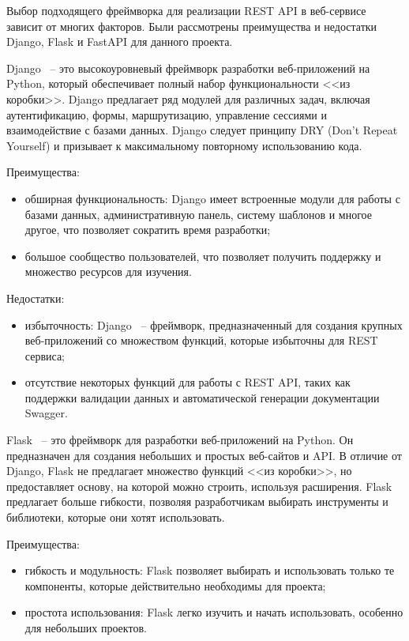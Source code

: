 Выбор подходящего фреймворка для реализации REST API в веб-сервисе зависит от многих факторов. Были рассмотрены преимущества и недостатки Django, Flask и FastAPI для данного проекта.

Django ~-- это высокоуровневый фреймворк разработки веб-приложений на Python, который обеспечивает полный набор функциональности <<из коробки>>. Django предлагает ряд модулей для различных задач, включая аутентификацию, формы, маршрутизацию, управление сессиями и взаимодействие с базами данных. Django следует принципу DRY (Don't Repeat Yourself) и призывает к максимальному повторному использованию кода.

Преимущества:
\begin{itemize}
    \item обширная функциональность: Django имеет встроенные модули для работы с базами данных, административную панель, систему шаблонов и многое другое, что позволяет сократить время разработки;
    \item большое сообщество пользователей, что позволяет получить поддержку и множество ресурсов для изучения.
\end{itemize}

Недостатки:
\begin{itemize}
    \item избыточность: Django ~-- фреймворк, предназначенный для создания крупных веб-приложений со множеством функций, которые избыточны для REST сервиса;
    \item отсутствие некоторых функций для работы с REST API, таких как поддержки валидации данных и автоматической генерации документации Swagger.
\end{itemize}

Flask ~-- это фреймворк для разработки веб-приложений на Python. Он предназначен для создания небольших и простых веб-сайтов и API. В отличие от Django, Flask не предлагает множество функций <<из коробки>>, но предоставляет основу, на которой можно строить, используя расширения. Flask предлагает больше гибкости, позволяя разработчикам выбирать инструменты и библиотеки, которые они хотят использовать.

Преимущества:
\begin{itemize}
    \item гибкость и модульность: Flask позволяет выбирать и использовать только те компоненты, которые действительно необходимы для проекта;
    \item простота использования: Flask легко изучить и начать использовать, особенно для небольших проектов.
\end{itemize}

